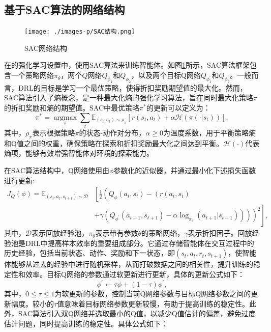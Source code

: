 \documentclass{article}
\begin{document}
\subsection{基于SAC算法的网络结构}\label{section3-2-2}
\begin{figure}[h]
	\centering
	\texttt{[image: ./images-p/SAC结构.png]}
	\caption{SAC网络结构}
	\label{Fig3-5}
\end{figure}
在的强化学习设置中，使用SAC算法来训练智能体。如图\ref{Fig3-5}所示，SAC算法框架包含一个策略网络$\pi_\theta$，两个$Q$网络$Q_{\phi_1}$和$Q_{\phi_2}$，以及两个目标Q网络$Q_{\phi_1^{\prime}}$和$Q_{\phi_2^{\prime}}$。一般而言，DRL的目标是学习一个最优策略，使得折扣奖励期望值的最大化。然而，SAC算法引入了熵概念，是一种最大化熵的强化学习算法，旨在同时最大化策略$\pi$的折扣奖励和熵的期望值。SAC中最优策略$\pi^\ast$的更新可以定义为：
\begin{equation}\label{eq14}
	\pi^\ast=\mathop{\arg\max}\limits_{\pi} \sum_t\mathbb{E}_{\left(s_t,a_t\right)\sim\rho_\pi}\left[r\left(s_t,a_t\right)+\alpha \mathcal{H}\left(\pi\left(\cdot|s_t\right)\right)\right],
\end{equation}
其中，$\rho_\pi$表示根据策略$\pi$的状态-动作对分布，$\alpha\ge0$为温度系数，用于平衡策略熵和Q值之间的权重，确保策略在探索和折扣奖励最大化之间达到平衡。$\mathcal{H}(\cdot)$代表熵项，能够有效增强智能体对环境的探索能力。\par 
在SAC算法结构中，Q网络使用由$\phi$参数化的近似器，并通过最小化下述损失函数进行更新:
\begin{align}\label{eq3-16}
	J_Q(\phi) = \mathbb{E}_{\left(s_t, a_t, s_{t+1}\right) \sim \mathcal{D}} & 
	\left[ \frac{1}{2} \left( Q_{\phi}(a_t, s_t) - \left( r(a_t, s_t) \right. \right. \right. \nonumber \\ 
	& \left. \left. \left. + \gamma \left( Q_{\phi^{'}}(a_{t+1}, s_{t+1}) - \alpha \log_{\pi_{\theta}}{(a_{t+1} | s_{t+1})} \right) \right) \right)^2 \right],
\end{align}
其中，$\mathcal{D}$表示回放经验池，$\pi_\theta$表示带有参数$\theta$的策略网络，$\gamma$表示折扣因子。回放经验池是DRL中提高样本效率的重要组成部分。它通过存储智能体在交互过程中的历史经验，包括当前状态、动作、奖励和下一状态，即$\left(s_t, a_t, r_t, s_{t+1}\right)$，使智能体能够从过去的经验中进行随机采样，从而打破数据之间的相关性，提升训练的稳定性和效率。目标Q网络的参数通过软更新进行更新，具体的更新公式如下：
\begin{equation}\label{eq3-17}
	\phi^{'} \gets \tau\phi+\left(1-\tau\right)\phi^{'},
\end{equation}
其中，$0 \le \tau \le 1$为软更新的参数，控制当前Q网络参数与目标Q网络参数之间的更新幅度。较小的$\tau$值意味着目标网络参数更新较慢，有助于提高训练的稳定性。此外，SAC算法引入双Q网络并选取最小的Q值，以减少Q值估计的偏差，避免过度估计问题，同时提高训练的稳定性。具体公式如下：
\end{document}
